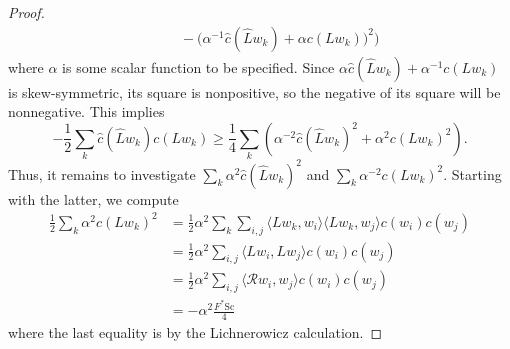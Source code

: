 \documentclass[12pt, reqno]{amsart}
\theoremstyle{plain} %
\theoremstyle{definition}
\theoremstyle{remark}
\numberwithin{equation}{section}
\newcommand{\dom}[1]{\hat{#1}}
\newcommand{\Sc}{\mathrm{Sc}}
\begin{document}
\begin{proof}
\begin{equation*}
\begin{aligned}
            &\qquad -\big(\alpha^{-1}\dom{c}(\dom{L}w_k)+\alpha c(Lw_k)\big)^2\Big)
        \end{aligned}
    \end{equation*}
    where \(\alpha\) is some scalar function to be specified.
    Since \(\alpha\dom{c}(\dom{L}w_k)+\alpha^{-1}c(Lw_k)\) is skew-symmetric, its square is nonpositive, so the negative of its square will be nonnegative.
    This implies
    \begin{equation*}
        -\frac{1}{2}\sum_k\dom{c}(\dom{L}w_k)c(Lw_k)\geq\frac{1}{4}\sum_{k}\left(\alpha^{-2}\dom{c}(\dom{L}w_k)^2+\alpha^2c(Lw_k)^2\right).
    \end{equation*}
    Thus, it remains to investigate \(\sum_k\alpha^2\dom{c}(\dom{L}w_k)^2\) and \(\sum_k\alpha^{-2}c(Lw_k)^2\).
    Starting with the latter, we compute
    \begin{equation*}
        \begin{aligned}
            \frac{1}{2}\sum_k\alpha^2c(Lw_k)^2&=\frac{1}{2}\alpha^2\sum_k\sum_{i,j}\langle Lw_k,w_i\rangle\langle Lw_k,w_j \rangle c(w_i)c(w_j)\\
            &=\frac{1}{2}\alpha^2\sum_{i,j}\langle Lw_i,Lw_j\rangle c(w_i)c(w_j)\\
            &=\frac{1}{2}\alpha^2\sum_{i,j}\langle \mathcal{R}w_i,w_j\rangle c(w_i)c(w_j)\\
            &=-\alpha^2\frac{F^*\Sc}{4}
        \end{aligned}
    \end{equation*}
    where the last equality is by the Lichnerowicz calculation.


\end{proof}
\end{document}
